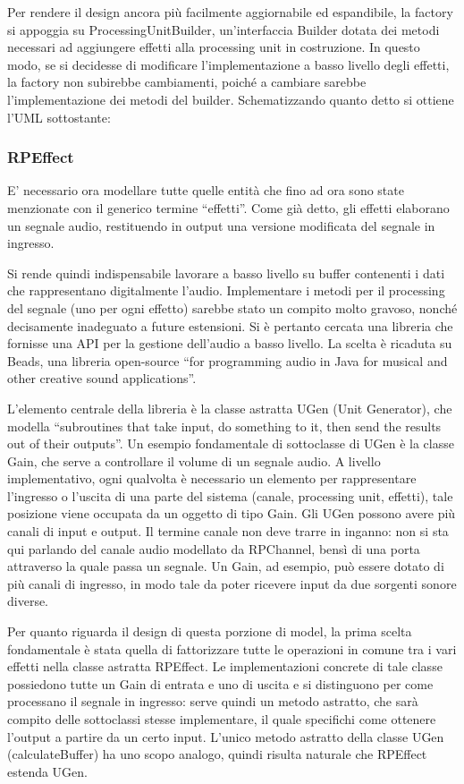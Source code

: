 \documentclass[a4paper,12pt]{report}
\begin{document}
Per rendere il design ancora più facilmente aggiornabile ed espandibile, la factory si appoggia su ProcessingUnitBuilder, un’interfaccia Builder dotata dei metodi necessari ad aggiungere effetti alla processing unit in costruzione. In questo modo, se si decidesse di modificare l’implementazione a basso livello degli effetti, la factory non subirebbe cambiamenti, poiché a cambiare sarebbe l’implementazione dei metodi del builder.
Schematizzando quanto detto si ottiene l’UML sottostante:
\endsubsubsection
\subsubsection{RPEffect}
E’ necessario ora modellare tutte quelle entità che fino ad ora sono state menzionate con il generico termine “effetti”. Come già detto, gli effetti elaborano un segnale audio, restituendo in output una versione modificata del segnale in ingresso. 

Si rende quindi indispensabile lavorare a basso livello su buffer contenenti i dati che rappresentano digitalmente l’audio. Implementare i metodi per il processing del segnale (uno per ogni effetto) sarebbe stato un compito molto gravoso, nonché decisamente inadeguato a future estensioni.
Si è pertanto cercata una libreria che fornisse una API per la gestione dell’audio a basso livello. La scelta è ricaduta su Beads, una libreria open-source “for programming audio in Java for musical and other creative sound applications”. 

L’elemento centrale della libreria è la classe astratta UGen (Unit Generator), che modella “subroutines that take input, do something to it, then send the results out of their outputs”.
Un esempio fondamentale di sottoclasse di UGen è la classe Gain, che serve a controllare il volume di un segnale audio. A livello implementativo, ogni qualvolta è necessario un elemento per rappresentare l’ingresso o l’uscita di una parte del sistema (canale, processing unit, effetti), tale posizione viene occupata da un oggetto di tipo Gain.
Gli UGen possono avere più canali di input e output. Il termine canale non deve trarre in inganno: non si sta qui parlando del canale audio modellato da RPChannel, bensì di una porta attraverso la quale passa un segnale. Un Gain, ad esempio, può essere dotato di più canali di ingresso, in modo tale da poter ricevere input da due sorgenti sonore diverse.

Per quanto riguarda il design di questa porzione di model, la prima scelta fondamentale è stata quella di fattorizzare tutte le operazioni in comune tra i vari effetti nella classe astratta RPEffect. Le implementazioni concrete di tale classe possiedono tutte un Gain di entrata e uno di uscita e si distinguono per come processano il segnale in ingresso: serve quindi un metodo astratto, che sarà compito delle sottoclassi stesse implementare, il quale specifichi come ottenere l’output a partire da un certo input. L’unico metodo astratto della classe UGen (calculateBuffer) ha uno scopo analogo, quindi risulta naturale che RPEffect estenda UGen. 
\end{document}
